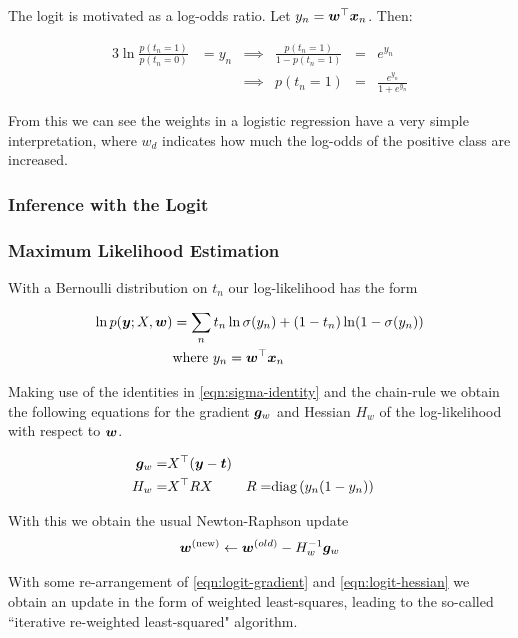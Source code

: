 The logit is motivated as a log-odds ratio. Let $y_n = \bm w^\top\bm x_n$. Then:

\begin{alignat}{3}
\ln \frac{p(t_n = 1)}{p(t_n = 0)}  & = y_n  &
\implies & \frac{p(t_n = 1)}{1 - p(t_n = 1)}  & = & e^{y_n} \\
& & \implies &  p(t_n = 1)                    & = & \frac{e^{y_n}}{1 + e^{y_n}}
\end{alignat}

From this we can see the weights in a logistic regression have a very simple interpretation, where $w_d$ indicates how much the log-odds of the positive class are increased.

\subsubsection{Inference with the Logit}

\subsubsection*{Maximum Likelihood Estimation}
With a Bernoulli distribution on $t_n$ our log-likelihood has the form

\begin{align}
\ln p(\bm y; X, \bm w) & = \sum_n t_n \ln \sigma(y_n) + (1 - t_n) \ln (1 - \sigma(y_n)) \\
& \text{where } y_n = \bm w^\top\bm x_n
\end{align}

Making use of the identities in \eqref{eqn:sigma-identity} and the chain-rule we obtain the following equations for the gradient $\bm g_w$ and Hessian $H_w$ of the log-likelihood with respect to $\bm w$.

\begin{align}
\bm g_w = & X^\top (\bm y - \bm t) \label{eqn:logit-gradient}\\
H_w      = & X^\top R X & R = & \text{diag} \left( {y_n (1 - y_n)} \right) \label{eqn:logit-hessian}
\end{align}

With this we obtain the usual Newton-Raphson update
\begin{align}
\bm w^{(\text{new})} \leftarrow \bm w^{(old)} - H_w^{-1} \bm g_w
\end{align}

With some re-arrangement of \eqref{eqn:logit-gradient} and \eqref{eqn:logit-hessian} we obtain an update in the form of weighted least-squares, leading to the so-called ``iterative re-weighted least-squared" algorithm.

